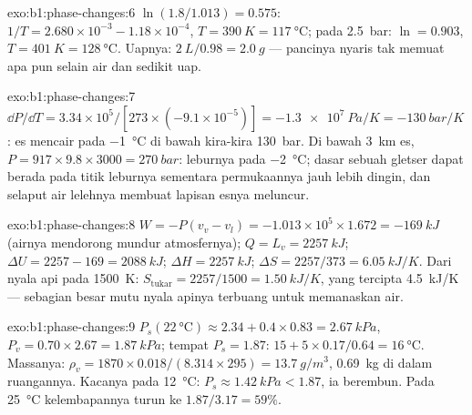 \begin{solution}{exo:b1:phase-changes:6}
$\ln(1.8/1.013) = 0.575$: $1/T = 2.680 \times 10^{-3} - 1.18 \times 10^{-4}$,
$T = \qty{390}{K} = \qty{117}{\degreeCelsius}$; pada \qty{2.5}{bar}: $\ln = 0.903$,
$T = \qty{401}{K} = \qty{128}{\degreeCelsius}$. Uapnya: $\qty{2}{L}/0.98 =
\qty{2.0}{g}$ --- pancinya nyaris tak memuat apa pun selain air dan sedikit
uap.
\end{solution}

\begin{solution}{exo:b1:phase-changes:7}
$\dd P/\dd T = 3.34 \times 10^5/[273 \times (-9.1 \times 10^{-5})] = \qty{-1.3e7}{Pa/K}
= \qty{-130}{bar/K}$: es mencair pada \qty{-1}{\degreeCelsius} di bawah kira-kira
\qty{130}{bar}. Di bawah \qty{3}{km} es, $P = 917 \times 9.8 \times 3000 =
\qty{270}{bar}$: leburnya pada \qty{-2}{\degreeCelsius}; dasar sebuah gletser dapat berada pada
titik leburnya sementara permukaannya jauh lebih dingin, dan selaput
air lelehnya membuat lapisan esnya meluncur.
\end{solution}

\begin{solution}{exo:b1:phase-changes:8}
$W = -P(v_v - v_l) = -1.013 \times 10^5 \times 1.672 = \qty{-169}{kJ}$ (airnya
mendorong mundur atmosfernya); $Q = L_v = \qty{2257}{kJ}$; $\Delta U = 2257 - 169
= \qty{2088}{kJ}$; $\Delta H = \qty{2257}{kJ}$; $\Delta S = 2257/373 = \qty{6.05}{kJ/K}$.
Dari nyala api pada \qty{1500}{K}: $S_{\mathrm{tukar}} = 2257/1500 = \qty{1.50}{kJ/K}$,
yang tercipta \qty{4.5}{kJ/K} --- sebagian besar mutu nyala apinya terbuang untuk memanaskan
air.
\end{solution}

\begin{solution}{exo:b1:phase-changes:9}
$P_s(\qty{22}{\degreeCelsius}) \approx 2.34 + 0.4 \times 0.83 = \qty{2.67}{kPa}$,
$P_v = 0.70 \times 2.67 = \qty{1.87}{kPa}$;  tempat $P_s = 1.87$: $15 +
5 \times 0.17/0.64 = \qty{16}{\degreeCelsius}$. Massanya: $\rho_v = 1870 \times 0.018/
(8.314 \times 295) = \qty{13.7}{g/m^3}$, \qty{0.69}{kg} di dalam ruangannya. Kacanya pada
\qty{12}{\degreeCelsius}: $P_s \approx \qty{1.42}{kPa} < 1.87$, ia berembun. Pada
\qty{25}{\degreeCelsius} kelembapannya turun ke $1.87/3.17 = 59\%$.
\end{solution}

